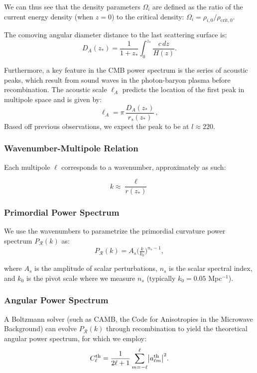 \documentclass[11pt]{article}
\theoremstyle{definition}
\begin{document}
  We can thus see that the density
  parameters $\Omega_i$ are defined as the ratio of the current energy density (when \( z = 0\)) to the critical density: $\Omega_i =
  \rho_{i,0}/\rho_{\mathrm{crit},0}$.

The comoving angular diameter distance to the last scattering surface is:
\begin{equation}
  D_A(z_*) 
  = \frac{1}{1+z_*}\int_0^{z_*}\frac{c\,dz}{H(z)}.
\end{equation}

Furthermore, a key feature in the CMB power spectrum is the series of acoustic peaks, which result from sound waves in the photon-baryon plasma before recombination. The acoustic scale $\ell_A$ predicts the location of the first peak in multipole space and is given by:
\begin{equation}
  \ell_A = \pi\,\frac{D_A(z_*)}{r_s(z_*)}\,,
\end{equation}
Based off previous observations, we expect the peak to be at $l\approx 220$.

\subsubsection{Wavenumber-Multipole Relation}
Each multipole $\ell$ corresponds to a wavenumber, approximately as such:

\begin{equation}
k \approx \frac{\ell}{r(z_*)}
\end{equation}

\subsubsection{Primordial Power Spectrum}
We use the wavenumbers to parametrize the primordial curvature power spectrum $P_{\mathcal{R}}(k)$ as:
\begin{equation}
  P_{\mathcal R}(k)
  = A_s\bigl(\tfrac{k}{k_0}\bigr)^{n_s-1},
\end{equation}

where $A_s$ is the amplitude of scalar perturbations, $n_s$ is the scalar spectral index, and \(k_0\) is the pivot scale where we measure $n_s$ (typically $k_0 = 0.05$ Mpc$^{-1}$).


\subsubsection{Angular Power Spectrum}
A Boltzmann solver (such as CAMB, the Code for Anisotropies in the Microwave Background) can evolve 
\(P_{\mathcal R}(k)\)
through recombination to yield the theoretical angular power spectrum, for which we employ:
\begin{equation}
  C_\ell^{\rm th}
  = \frac{1}{2\ell+1}\sum_{m=-\ell}^{\ell}\bigl|a_{\ell m}^{\rm th}\bigr|^2.
\end{equation}
\end{document}
